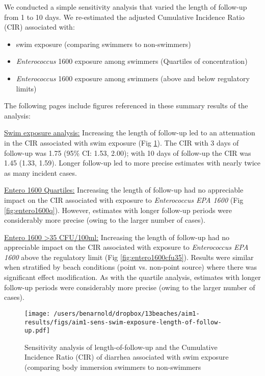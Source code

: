 \documentclass[11pt]{article}
\begin{document}
We conducted a simple sensitivity analysis that varied the length of follow-up from 1 to 10 days.  We re-estimated the adjusted Cumulative Incidence Ratio (CIR) associated with:
\begin{itemize}
	\item swim exposure (comparing swimmers to non-swimmers)
	\item \textit{Enterococcus}  1600 exposure among swimmers (Quartiles of concentration)
	\item \textit{Enterococcus}  1600 exposure among swimmers (above and below regulatory limits)
\end{itemize}

The following pages include figures referenced in these summary results of the analysis:

\underline{Swim exposure analysis:} Increasing the length of follow-up led to an attenuation in the CIR associated with swim exposure (Fig \ref{fig:swimex}).  The CIR with 3 days of follow-up was 1.75 (95\% CI: 1.53, 2.00); with 10 days of follow-up the CIR was 1.45 (1.33, 1.59).  Longer follow-up led to more precise estimates with nearly twice as many incident cases.

\underline{Entero 1600 Quartiles:} Increasing the length of follow-up had no appreciable impact on the CIR associated with exposure to \textit{Enterococcus EPA 1600} (Fig \ref{fig:entero1600q}). However, estimates with longer follow-up periods were considerably more precise (owing to the larger number of cases).

\underline{Entero 1600 >35 CFU/100ml:} Increasing the length of follow-up had no appreciable impact on the CIR associated with exposure to \textit{Enterococcus EPA 1600} above the regulatory limit (Fig \ref{fig:entero1600cfu35}). Results were similar when stratified by beach conditions (point vs. non-point source) where there was significant effect modification. As with the quartile analysis, estimates with longer follow-up periods were considerably more precise (owing to the larger number of cases).

\clearpage
\begin{figure}[htbp]
\begin{center}
\texttt{[image: /users/benarnold/dropbox/13beaches/aim1-results/figs/aim1-sens-swim-exposure-length-of-follow-up.pdf]}
\begin{minipage}{0.8\textwidth}
\caption{Sensitivity analysis of length-of-follow-up and the Cumulative Incidence Ratio (CIR) of diarrhea associated with swim exposure (comparing body immersion swimmers to non-swimmers}
\label{fig:swimex}
\end{minipage}
\end{center}
\end{figure}
\end{document}
